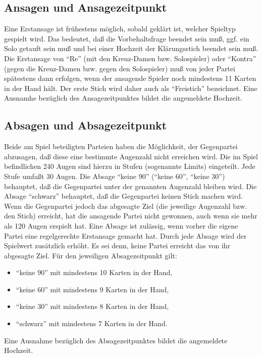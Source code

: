 \documentclass[12pt]{scrartcl}
\begin{document}
\subsection{Ansagen und Ansagezeitpunkt}
Eine Erstansage ist frühestens möglich, sobald geklärt ist,
welcher Spieltyp gespielt wird. Das bedeutet, daß die
Vorbehaltsfrage beendet sein muß, ggf. ein Solo getauft sein
muß und bei einer Hochzeit der Klärungsstich beendet sein muß.
Die Erstansage von "`Re"' (mit den Kreuz-Damen bzw. Solospieler)
oder "`Kontra"' (gegen die Kreuz-Damen bzw. gegen den
Solospieler) muß von jeder Partei spätestens dann erfolgen,
wenn der ansagende Spieler noch mindestens 11 Karten in der Hand
hält. Der erste Stich wird daher auch als "`Freistich"'
bezeichnet. Eine Ausnamhe bezüglich des Ansagezeitpunktes bildet
die angemeldete Hochzeit.

\subsection{Absagen und Absagezeitpunkt}
Beide am Spiel beteiligten Parteien haben die Möglichkeit, der
Gegenpartei abzusagen, daß diese eine bestimmte Augenzahl nicht
erreichen wird. Die im Spiel befindlichen 240 Augen sind hierzu
in Stufen (sogenannte Limits) eingeteilt. Jede Stufe umfaßt 30
Augen. Die Absage "`keine 90"' ("`keine 60"', "`keine 30"')
behauptet, daß die Gegenpartei unter der genannten Augenzahl
bleiben wird. Die Absage "`schwarz"' behauptet, daß die
Gegenpartei keinen Stich machen wird. Wenn die Gegenpartei jedoch
das abgesagte Ziel (die jeweilige Augenzahl bzw. den Stich)
erreicht, hat die ansagende Partei nicht gewonnen, auch wenn sie
mehr als 120 Augen erspielt hat. Eine Absage ist zulässig, wenn
vorher die eigene Partei eine regelgerechte Erstansage gemacht
hat. Durch jede Absage wird der Spielwert zusätzlich erhöht. Es
sei denn, keine Partei erreicht das von ihr abgesagte Ziel. Für
den jeweiligen Absagezeitpunkt gilt:
\begin{itemize}
  \item "`keine 90"' mit mindestens 10 Karten in der Hand,
  \item "`keine 60"' mit mindestens 9 Karten in der Hand,
  \item "`keine 30"' mit mindestens 8 Karten in der Hand,
  \item "`schwarz"' mit mindestens 7 Karten in der Hand.
\end{itemize}
Eine Ausnahme bezüglich des Absagezeitpunktes bildet die angemeldete Hochzeit.
\end{document}
